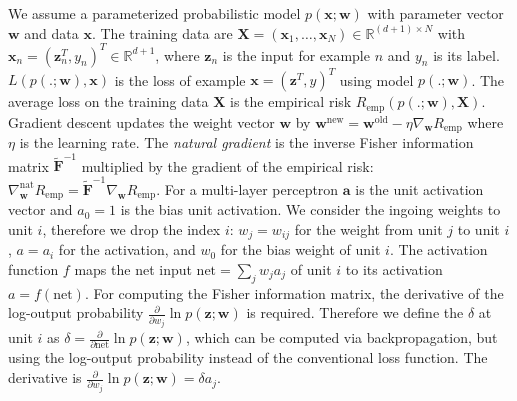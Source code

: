 \documentclass{article}
\newcommand\Ba{\bm{a}}
\newcommand\Bw{\bm{w}}
\newcommand\Bx{\bm{x}}
\newcommand\Bz{\bm{z}}
\newcommand\BF{\bm{F}}
\newcommand\BX{\bm{X}}
\newcommand\bbR{\mathbb{R}}
\begin{document}
We assume a parameterized probabilistic model $p(\Bx;\Bw)$
with parameter vector $\Bw$ and data $\Bx$.
The training data are $\BX=(\Bx_1,\ldots,\Bx_N) \in
\bbR^{(d+1)\times N}$ with
$\Bx_n = (\Bz_n^T,y_n)^T \in \bbR^{d+1}$, where $\Bz_n$ is the
input for example $n$ and $y_n$ is its label.
$L(p(.;\Bw),\Bx)$ is the loss of example $\Bx=(\Bz^T,y)^T$ using model
$p(.;\Bw)$. The average loss on the
training data $\BX$ is the empirical risk $R_{\mathrm{emp}}(p(.;\Bw),\BX)$.
Gradient descent updates the
weight vector $\Bw$ by
$\Bw^{\mathrm{new}} =  \Bw^{\mathrm{old}} - \eta \nabla_{\Bw} R_{\mathrm{emp}}$
where $\eta$ is the learning rate.
The {\em natural gradient} is the inverse Fisher
information matrix $\tilde{\BF}^{-1}$ multiplied by the gradient of the empirical
risk:
$\nabla_{\Bw}^{\mathrm{nat}} R_{\mathrm{emp}}  =  \tilde{\BF}^{-1} \nabla_{\Bw} R_{\mathrm{emp}}$.
For a  multi-layer perceptron
$\Ba$ is the unit activation vector and $a_0=1$ is the
bias unit activation.
We consider the ingoing weights to unit $i$, therefore we drop the
index $i$: $w_j=w_{ij}$ for the weight from unit $j$
to unit $i$, $a=a_i$ for the activation, and $w_{0}$ for the bias weight of unit $i$.
The activation function $f$ maps
the net input $\mathrm{net}=\sum_{j} w_{j} a_j$ of unit $i$ to its activation
$a =  f(\mathrm{net})$.
For computing the Fisher information matrix, the derivative of
the log-output probability
$\frac{\partial }{\partial w_{j}} \ln p(\Bz; \Bw)$ is required.
Therefore we define the $\delta$ at unit $i$ as
$\delta = \frac{\partial }{\partial
\mathrm{net}}  \ln p(\Bz; \Bw)$,
which can be computed via backpropagation, but using
the log-output probability instead of the conventional loss function.
The derivative is
$\frac{\partial }{\partial w_{j}} \ln
p(\Bz; \Bw ) =  \delta  a_j$.
\end{document}
